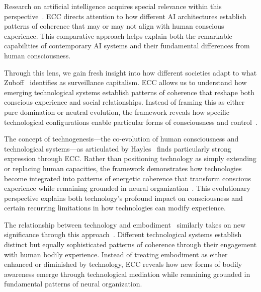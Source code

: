 Research on artificial intelligence acquires special relevance within this perspective~\cite{clark2003natural}. ECC directs attention to how different AI architectures establish patterns of coherence that may or may not align with human conscious experience. This comparative approach helps explain both the remarkable capabilities of contemporary AI systems and their fundamental differences from human consciousness.


Through this lens, we gain fresh insight into how different societies adapt to what Zuboff~\cite{zuboff2019age} identifies as surveillance capitalism. ECC allows us to understand how emerging technological systems establish patterns of coherence that reshape both conscious experience and social relationships. Instead of framing this as either pure domination or neutral evolution, the framework reveals how specific technological configurations enable particular forms of consciousness and control~\cite{schull2014addiction}.

The concept of technogenesis—the co-evolution of human consciousness and technological systems—as articulated by Hayles~\cite{hayles2012how} finds particularly strong expression through ECC. Rather than positioning technology as simply extending or replacing human capacities, the framework demonstrates how technologies become integrated into patterns of energetic coherence that transform conscious experience while remaining grounded in neural organization~\cite{hui2019recursivity}. This evolutionary perspective explains both technology's profound impact on consciousness and certain recurring limitations in how technologies can modify experience.

The relationship between technology and embodiment~ similarly takes on new significance through this approach~\cite{ihde2009postphenomenology,suchman2016reconfiguring}. Different technological systems establish distinct but equally sophisticated patterns of coherence through their engagement with human bodily experience. Instead of treating embodiment as either enhanced or diminished by technology, ECC reveals how new forms of bodily awareness emerge through technological mediation while remaining grounded in fundamental patterns of neural organization.

